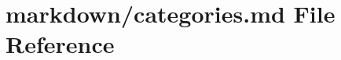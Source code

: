 \hypertarget{categories_8md}{}\section{markdown/categories.md File Reference}
\label{categories_8md}

